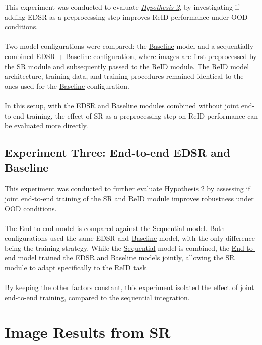 This experiment was conducted to evaluate \hyperlink{hypothesis:2}{\textit{Hypothesis 2}}, by investigating if adding \acs{EDSR} as a preprocessing step improves \acs{ReID} performance under \acs{OOD} conditions. 
\\\\
Two model configurations were compared: the \hyperlink{model:baseline}{Baseline} model and a sequentially combined \acs{EDSR} + \hyperlink{model:baseline}{Baseline} configuration, where images are first preprocessed by the \acs{SR} module and subsequently passed to the \acs{ReID} module. The \acs{ReID} model architecture, training data, and training procedures remained identical to the ones used for the \hyperlink{model:baseline}{Baseline} configuration.
\\\\
In this setup, with the \acs{EDSR} and \hyperlink{model:baseline}{Baseline} modules combined without joint end-to-end training, the effect of \acs{SR} as a preprocessing step on \acs{ReID} performance can be evaluated more directly. 


\subsection{Experiment Three: End-to-end \acs{EDSR} and Baseline}

This experiment was conducted to further evaluate \hyperlink{hypothesis:2}{Hypothesis 2} by assessing if joint end-to-end training of the \acs{SR} and \acs{ReID} module improves robustness under \acs{OOD} conditions.
\\\\
The \hyperlink{model:endtoend}{End-to-end} model is compared against the \hyperlink{Sequential}{Sequential} model. Both configurations used the same \acs{EDSR} and \hyperlink{model:baseline}{Baseline} model, with the only difference being the training strategy. While the \hyperlink{model:sequential}{Sequential} model is combined, the \hyperlink{model:endtoend}{End-to-end} model trained the \acs{EDSR} and \hyperlink{model:baseline}{Baseline} models jointly, allowing the \acs{SR} module to adapt specifically to the \acs{ReID} task.
\\\\
By keeping the other factors constant, this experiment isolated the effect of joint end-to-end training, compared to the sequential integration. 

\section{Image Results from SR}\label{kunfordigstoyan}

